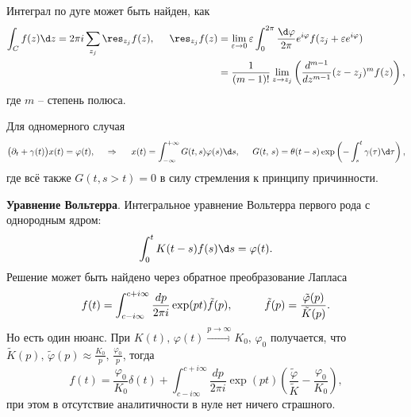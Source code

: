 




Интеграл по дуге может быть найден, как
\begin{align*}
    \int_C f(z) \d z = 2 \pi i \sum_{z_j} \res_{z_j} f(z),
    \hspace{5 mm} 
    \res_{z_j} f(z) &= \lim_{\varepsilon \to 0} \varepsilon \int_0^{2\pi} \frac{\d \varphi}{2\pi} e^{i \varphi} f(z_j + \varepsilon e^{i \varphi}) \\ 
    &= \frac{1}{(m-1)!} \lim_{z \to z_j} \left(
        \frac{d^{m-1} }{d z^{m-1}} (z-z_j)^m f(z)
    \right),
\end{align*}
где $m$ -- степень полюса. 






Для одномерного случая
\begin{equation*}
    \big(\partial_t + \gamma(t)\big) x(t) = \varphi(t),
    \hspace{0.5cm} \Rightarrow \hspace{0.5cm}
    x(t) = \int_{-\infty}^{+\infty}  G(t,s) \varphi(s) \d s,
    \hspace{5 mm} 
    G(t,\,  s) = \theta(t-s) \exp\left(
        - \int_{s}^{t} \gamma(\tau) \d \tau
    \right),
\end{equation*}
где всё также $G(t, s>t) = 0$ в силу стремления к принципу причинности. 






\textbf{Уравнение Вольтерра}. Интегральное уравнение Вольтерра первого рода с однородным ядром:
\begin{equation*}
    \int_{0}^{t}  K(t-s) f(s) \d s = \varphi(t).
\end{equation*}
Решение может быть найдено через обратное преобразование Лапласа
\begin{equation*}
    f(t) = \int_{c-i \infty}^{c+i \infty} \frac{d p}{2 \pi i} \exp(pt) \tilde{f}(p),
    \hspace{10 mm} 
    \tilde{f}(p) = \frac{\tilde{\varphi}(p)}{\tilde{K}(p)}.
\end{equation*}
Но есть один нюанс. При $K(t),\, \varphi(t) \overset{p \to \infty}{\to} K_0,\, \varphi_0$ получается, что $\tilde{K}(p),\, \tilde{\varphi}(p) \approx \frac{K_0}{p},\, \frac{\varphi_0}{p}$, тогда
\begin{equation*}
    f(t) = \frac{\varphi_0}{K_0} \delta(t) + \int_{c-i \infty}^{c+i \infty} \frac{d p}{2 \pi i} \exp(p t)
    \left(
        \frac{\tilde{\varphi}}{\tilde{K}} - \frac{\varphi_0}{K_0}
    \right),
\end{equation*}
при этом в отсутствие аналитичности в нуле нет ничего страшного. 




